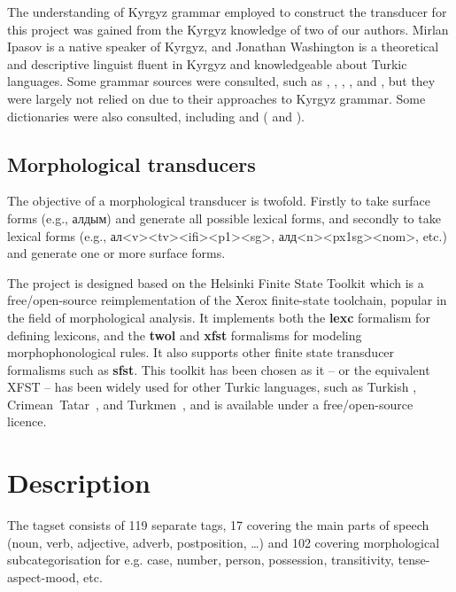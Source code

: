 \documentclass[10pt,a4paper,twocolumn]{article}
\newcommand{\citetwoyears}[2]{\citeauthor{#1} (\citeyear{#1} and \citeyear{#2})}
\begin{document}
The understanding of Kyrgyz grammar employed to construct the transducer for this project was gained from the Kyrgyz knowledge of two of our authors.  Mirlan Ipasov is a native speaker of Kyrgyz, and Jonathan Washington is a theoretical and descriptive linguist fluent in Kyrgyz and knowledgeable about Turkic languages.  Some grammar sources were consulted, such as \cite{hebertpoppe1963}, \cite{usonalievomuraliev2003}, \cite{qudaybergenov1980}, \cite{somfaikara2003}, and \cite{imart1981}, but they were largely not relied on due to their approaches to Kyrgyz grammar.  Some dictionaries were also consulted, including \cite{jumakunova2005} and \citetwoyears{yudakhin1957}{yudakhin1965}.

\subsection{Morphological transducers}
The objective of a morphological transducer is twofold. Firstly to take surface forms (e.g., алдым) and generate all possible lexical forms, and secondly to take lexical forms (e.g.,  ал<v><tv><ifi><p1><sg>, алд<n><px1sg><nom>, etc.) and generate one or more surface forms. 

The project is designed based on the Helsinki Finite State Toolkit \citep{linden2011} which is a free/open-source reimplementation of the Xerox finite-state toolchain, popular in the field of morphological analysis. It implements both the \textbf{lexc} formalism for defining lexicons, and the \textbf{twol} and \textbf{xfst} formalisms for modeling morphophonological rules. It also supports other finite state transducer formalisms such as \textbf{sfst}. This toolkit has been chosen as it -- or the equivalent XFST -- has been widely used for other Turkic languages, such as Turkish \citep{coltekin2010}, Crimean~Tatar~\citep{altintas2001}, and Turkmen~\citep{tantug2006}, and is available under a free/open-source licence.

\section{Description}
The tagset consists of 119 separate tags, 17 covering the main parts of speech (noun, verb, adjective, adverb, postposition, \ldots{}) and 102 covering morphological subcategorisation for e.g. case, number, person, possession, transitivity, tense-aspect-mood, etc.
\end{document}
